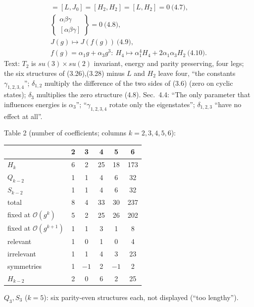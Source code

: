 \documentclass[10pt]{article}
\newcommand{\bs}[2]{\left\{\begin{smallmatrix}#1\\ #2\end{smallmatrix}\right\}}
\begin{document}
\begin{gather*}
[H_2,J_0]=[L,J_0]=[H_2,H_2]=[L,H_2]=0\ \text{(4.7)},\\ \bs{\alpha\beta\gamma}{[\alpha\beta\gamma]}=0\ \text{(4.8)},\\ J(g)\mapsto J(f(g))\ \text{(4.9)},\\ f(g)=\alpha_1g+\alpha_3g^3:\ H_4\mapsto\alpha_1^4H_4+2\alpha_1\alpha_3H_2\ \text{(4.10)}.
\end{gather*}
Text: $T_2$ is $su(3)\times su(2)$ invariant, energy and parity preserving, four legs; the six structures of (3.26),(3.28) minus $L$ and $H_2$ leave four, ``the constants $\gamma_{1,2,3,4}$''; $\delta_{1,2}$ multiply the difference of the two sides of (3.6) (zero on cyclic states); $\delta_3$ multiplies the zero structure (4.8). Sec.\ 4.4: ``The only parameter that influences energies is $\alpha_3$''; ``$\gamma_{1,2,3,4}$ rotate only the eigenstates''; $\delta_{1,2,3}$ ``have no effect at all''.

Table 2 (number of coefficients; columns $k=2,3,4,5,6$):
\begin{center}
\begin{tabular}{l|ccccc}
 & 2&3&4&5&6\\ \hline
$H_k$ & 6&2&25&18&173\\
$Q_{k-2}$ & 1&1&4&6&32\\
$S_{k-2}$ & 1&1&4&6&32\\
total & 8&4&33&30&237\\
fixed at $\mathcal O(g^k)$ & 5&2&25&26&202\\
fixed at $\mathcal O(g^{k+1})$ & 1&1&3&1&8\\
relevant & 1&0&1&0&4\\
irrelevant & 1&1&4&3&23\\
symmetries & 1&$-1$&2&$-1$&2\\
$H_{k-2}$ & 2&0&6&2&25
\end{tabular}
\end{center}
$Q_3,S_3$ ($k=5$): six parity-even structures each, not displayed (``too lengthy'').
\end{document}

